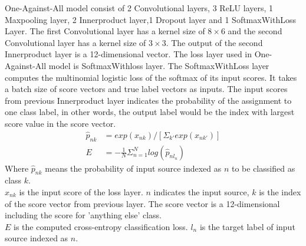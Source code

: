 One-Against-All model consist of 2 Convolutional layers, 3 ReLU layers, 1 Maxpooling layer, 2 Innerproduct layer,1 Dropout layer and 1 SoftmaxWithLoss Layer. The first Convolutional layer has a kernel size of $8\times 6$ and the second Convolutional layer has a kernel size of $3\times 3$. The output of the second Innerproduct layer is a 12-dimensional vector. The loss layer used in One-Against-All model is SoftmaxWithloss layer. The SoftmaxWithLoss layer computes the multinomial logistic loss of the softmax of its input scores. It takes a batch size of score vectors and true label vectors as inputs. The input scores from previous Innerproduct layer indicates the probability of the assignment to one class label, in other words, the output label would be the index with largest score value in the score vector.
\begin{align}
	\hat{p}_{nk}&=exp(x_{nk})/[\Sigma_{k'}exp(x_{nk'})]\\
	E &= -\frac{1}{N}\Sigma_{n=1}^{N}log(\hat{p}_{nl_n})
\end{align}
Where $\hat{p}_{nk}$ means the probability of input source indexed as $n$ to be classified as class $k$.\\
$x_{nk}$ is the input score of the loss layer. $n$ indicates the input source, $k$ is the index of the score vector from previous layer. The score vector is a 12-dimensional including the score for 'anything else' class.\\
$E$ is the computed cross-entropy classification loss. $l_n$ is the target label of input source indexed as $n$.
